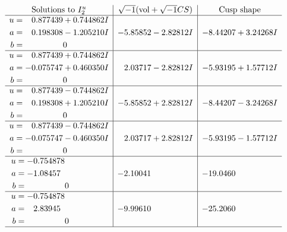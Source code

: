 \documentclass[1p]{elsarticle_modified}
\theoremstyle{definition}
\newcommand{\I}{\sqrt{-1}}
\begin{document}
$$\begin{array}{c|c|c}  
\text{Solutions to }I^u_{2}& \I (\text{vol} + \sqrt{-1}CS) & \text{Cusp shape}\\
 \hline 
\begin{aligned}
u &= \phantom{-}0.877439 + 0.744862 I \\
a &= \phantom{-}0.198308 - 1.205210 I \\
b &= \phantom{-0.000000 } 0\end{aligned}
 & -5.85852 - 2.82812 I & -8.44207 + 3.24268 I \\ \hline\begin{aligned}
u &= \phantom{-}0.877439 + 0.744862 I \\
a &= -0.075747 + 0.460350 I \\
b &= \phantom{-0.000000 } 0\end{aligned}
 & \phantom{-}2.03717 - 2.82812 I & -5.93195 + 1.57712 I \\ \hline\begin{aligned}
u &= \phantom{-}0.877439 - 0.744862 I \\
a &= \phantom{-}0.198308 + 1.205210 I \\
b &= \phantom{-0.000000 } 0\end{aligned}
 & -5.85852 + 2.82812 I & -8.44207 - 3.24268 I \\ \hline\begin{aligned}
u &= \phantom{-}0.877439 - 0.744862 I \\
a &= -0.075747 - 0.460350 I \\
b &= \phantom{-0.000000 } 0\end{aligned}
 & \phantom{-}2.03717 + 2.82812 I & -5.93195 - 1.57712 I \\ \hline\begin{aligned}
u &= -0.754878\phantom{ +0.000000I} \\
a &= -1.08457\phantom{ +0.000000I} \\
b &= \phantom{-0.000000 } 0\end{aligned}
 & -2.10041\phantom{ +0.000000I} & -19.0460\phantom{ +0.000000I} \\ \hline\begin{aligned}
u &= -0.754878\phantom{ +0.000000I} \\
a &= \phantom{-}2.83945\phantom{ +0.000000I} \\
b &= \phantom{-0.000000 } 0\end{aligned}
 & -9.99610\phantom{ +0.000000I} & -25.2060\phantom{ +0.000000I}\\
 \hline 
 \end{array}$$\newpage
\end{document}
